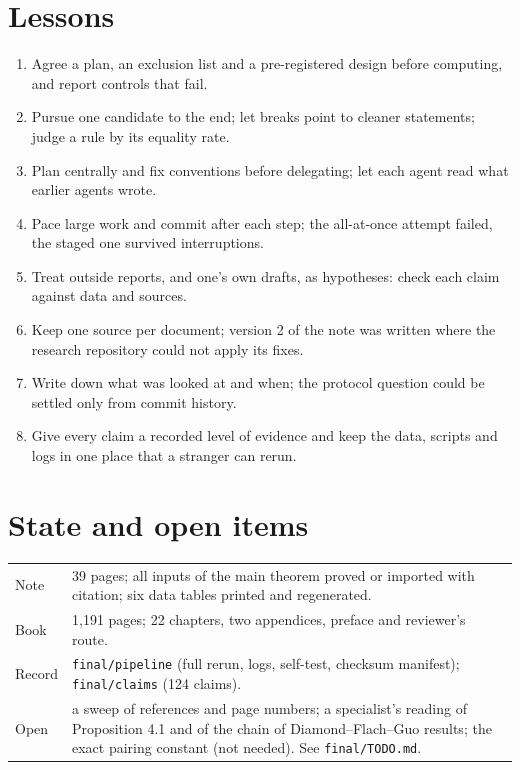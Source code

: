 \documentclass[11pt,a4paper]{article}
\begin{document}
\section{Lessons}
\begin{enumerate}
\item Agree a plan, an exclusion list and a pre-registered design before computing, and report controls that fail.
\item Pursue one candidate to the end; let breaks point to cleaner statements; judge a rule by its equality rate.
\item Plan centrally and fix conventions before delegating; let each agent read what earlier agents wrote.
\item Pace large work and commit after each step; the all-at-once attempt failed, the staged one survived interruptions.
\item Treat outside reports, and one's own drafts, as hypotheses: check each claim against data and sources.
\item Keep one source per document; version 2 of the note was written where the research repository could not apply its fixes.
\item Write down what was looked at and when; the protocol question could be settled only from commit history.
\item Give every claim a recorded level of evidence and keep the data, scripts and logs in one place that a stranger can rerun.
\end{enumerate}

\section{State and open items}
\begin{tabularx}{\textwidth}{@{}lX@{}}
\toprule
Note & 39 pages; all inputs of the main theorem proved or imported with citation; six data tables printed and regenerated.\\
Book & 1,191 pages; 22 chapters, two appendices, preface and reviewer's route.\\
Record & \texttt{final/pipeline} (full rerun, logs, self-test, checksum manifest); \texttt{final/claims} (124 claims).\\
Open & a sweep of references and page numbers; a specialist's reading of Proposition 4.1 and of the chain of Diamond--Flach--Guo results; the exact pairing constant (not needed). See \texttt{final/TODO.md}.\\
\bottomrule
\end{tabularx}
\end{document}
